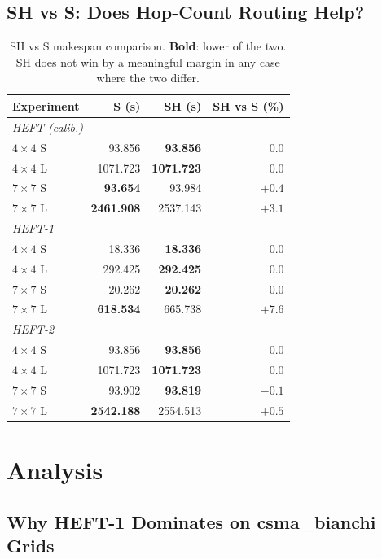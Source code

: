 \documentclass[11pt]{article}
\begin{document}
\subsection{SH vs S: Does Hop-Count Routing Help?}
\begin{table}[H]
\centering
\begin{tabular}{l r r r}
\toprule
\textbf{Experiment} & \textbf{S (s)} & \textbf{SH (s)} & \textbf{SH vs S (\%)} \\
\midrule
\multicolumn{4}{l}{\textit{HEFT (calib.)}} \\
$4\times4$ S & 93.856 & \textbf{93.856} & $0.0$ \\
$4\times4$ L & 1071.723 & \textbf{1071.723} & $0.0$ \\
$7\times7$ S & \textbf{93.654} & 93.984 & $+0.4$ \\
$7\times7$ L & \textbf{2461.908} & 2537.143 & $+3.1$ \\
\midrule
\multicolumn{4}{l}{\textit{HEFT-1}} \\
$4\times4$ S & 18.336 & \textbf{18.336} & $0.0$ \\
$4\times4$ L & 292.425 & \textbf{292.425} & $0.0$ \\
$7\times7$ S & 20.262 & \textbf{20.262} & $0.0$ \\
$7\times7$ L & \textbf{618.534} & 665.738 & $+7.6$ \\
\midrule
\multicolumn{4}{l}{\textit{HEFT-2}} \\
$4\times4$ S & 93.856 & \textbf{93.856} & $0.0$ \\
$4\times4$ L & 1071.723 & \textbf{1071.723} & $0.0$ \\
$7\times7$ S & 93.902 & \textbf{93.819} & $-0.1$ \\
$7\times7$ L & \textbf{2542.188} & 2554.513 & $+0.5$ \\
\bottomrule
\end{tabular}
\caption{SH vs S makespan comparison. \textbf{Bold}: lower of the two. SH does not win by a meaningful margin in any case where the two differ.}
\end{table}

\section{Analysis}

\subsection{Why HEFT-1 Dominates on csma\_bianchi Grids}
\end{document}
